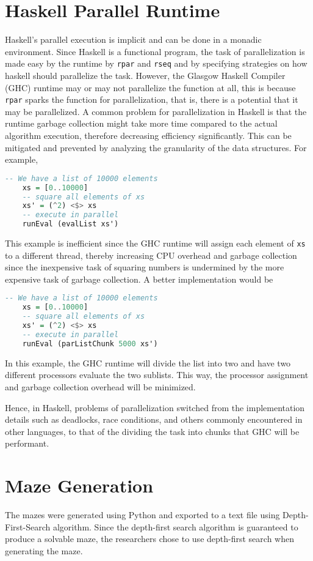 \section{Haskell Parallel Runtime}
Haskell's parallel execution is implicit and can be done in a monadic environment.\cite{Marlow2013}
Since Haskell is a functional program, the task of parallelization is made easy by the runtime 
by \lstinline{rpar} and \lstinline{rseq} and by specifying strategies on how haskell should 
parallelize the task. However, the Glasgow Haskell Compiler (GHC) runtime may or may not parallelize 
the function at all, this is because \lstinline{rpar} sparks the function for parallelization, that is,
there is a potential that it may be parallelized.\cite{Marlow2005} A common problem for parallelization 
in Haskell is that the runtime garbage collection might take more time compared to the actual algorithm 
execution, therefore decreasing efficiency significantly. This can be mitigated and prevented by analyzing 
the granularity of the data structures. For example,
\begin{lstlisting}[language=Haskell]
    -- We have a list of 10000 elements
    xs = [0..10000]
    -- square all elements of xs
    xs' = (^2) <$> xs
    -- execute in parallel
    runEval (evalList xs')
\end{lstlisting}
This example is inefficient since the GHC runtime will assign each element of \lstinline{xs} to a different 
thread, thereby increasing CPU overhead and garbage collection since the inexpensive task of squaring 
numbers is undermined by the more expensive task of garbage collection. A better implementation would be 
\begin{lstlisting}[language=Haskell]
    -- We have a list of 10000 elements
    xs = [0..10000]
    -- square all elements of xs
    xs' = (^2) <$> xs
    -- execute in parallel
    runEval (parListChunk 5000 xs')
\end{lstlisting}
In this example, the GHC runtime will divide the list into two and have two different processors 
evaluate the two sublists. This way, the processor assignment and garbage collection overhead will be minimized.

Hence, in Haskell, problems of parallelization switched from the implementation details such as deadlocks, 
race conditions, and others commonly encountered in other languages, to that of the dividing the task into 
chunks that GHC will be performant.

\section{Maze Generation}
The mazes were generated using Python and exported to a text file using Depth-First-Search algorithm.
Since the depth-first search algorithm is guaranteed to produce a solvable maze, the researchers chose to use 
depth-first search when generating the maze.

